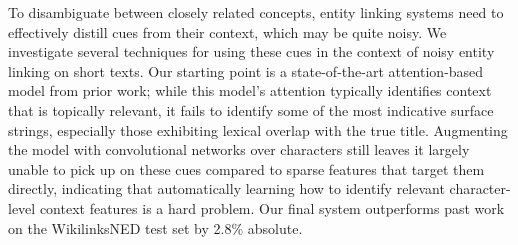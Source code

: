 To disambiguate between closely related concepts, entity linking systems need to effectively distill cues from their context, which may be quite noisy. We investigate several techniques for using these cues in the context of noisy entity linking on short texts. Our starting point is a state-of-the-art attention-based model from prior work; while this model's attention typically identifies context that is topically relevant, it fails to identify some of the most indicative surface strings, especially those exhibiting lexical overlap with the true title. Augmenting the model with convolutional networks over characters still leaves it largely unable to pick up on these cues compared to sparse features that target them directly, indicating that automatically learning how to identify relevant character-level context features is a hard problem. Our final system outperforms past work on the WikilinksNED test set by 2.8\% absolute.
